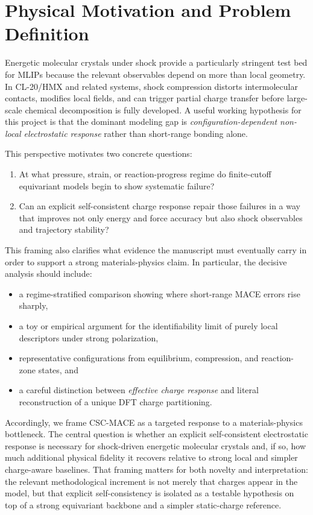 \section{Physical Motivation and Problem Definition}
\label{sec:motivation}

Energetic molecular crystals under shock provide a particularly stringent test bed for MLIPs because the relevant observables depend on more than local geometry. In CL-20/HMX and related systems, shock compression distorts intermolecular contacts, modifies local fields, and can trigger partial charge transfer before large-scale chemical decomposition is fully developed. A useful working hypothesis for this project is that the dominant modeling gap is \emph{configuration-dependent non-local electrostatic response} rather than short-range bonding alone.

This perspective motivates two concrete questions:
\begin{enumerate}
    \item At what pressure, strain, or reaction-progress regime do finite-cutoff equivariant models begin to show systematic failure?
    \item Can an explicit self-consistent charge response repair those failures in a way that improves not only energy and force accuracy but also shock observables and trajectory stability?
\end{enumerate}

This framing also clarifies what evidence the manuscript must eventually carry in order to support a strong materials-physics claim. In particular, the decisive analysis should include:
\begin{itemize}
    \item a regime-stratified comparison showing where short-range MACE errors rise sharply,
    \item a toy or empirical argument for the identifiability limit of purely local descriptors under strong polarization,
    \item representative configurations from equilibrium, compression, and reaction-zone states, and
    \item a careful distinction between \emph{effective charge response} and literal reconstruction of a unique DFT charge partitioning.
\end{itemize}

Accordingly, we frame CSC-MACE as a targeted response to a materials-physics bottleneck. The central question is whether an explicit self-consistent electrostatic response is necessary for shock-driven energetic molecular crystals and, if so, how much additional physical fidelity it recovers relative to strong local and simpler charge-aware baselines. That framing matters for both novelty and interpretation: the relevant methodological increment is not merely that charges appear in the model, but that explicit self-consistency is isolated as a testable hypothesis on top of a strong equivariant backbone and a simpler static-charge reference.
